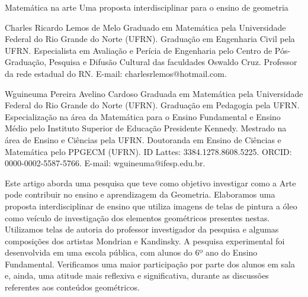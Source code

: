 \begin{refsection}
    \renewcommand{\thefigure}{\arabic{figure}}
    
    \chapterTwoLines
    {Matemática na arte}
    {Uma proposta interdisciplinar para o ensino de geometria}
    \label{chap:matematicanaarte}
    
    \articleAuthor
    {Charles Ricardo Lemos de Melo}
    {Graduado em Matemática pela Universidade Federal do Rio Grande do Norte (UFRN). Graduação em Engenharia Civil pela UFRN. Especialista em Avaliação e Perícia de Engenharia pelo Centro de Pós-Graduação, Pesquisa e Difusão Cultural das faculdades Oswaldo Cruz. Professor da rede estadual do RN. E-mail: charlesrlemos@hotmail.com.}
    
    \articleAuthor
    {Wguineuma Pereira Avelino Cardoso}
    {Graduada em Matemática pela Universidade Federal do Rio Grande do Norte (UFRN). Graduação em Pedagogia pela UFRN. Especialização na área da Matemática para o Ensino Fundamental e Ensino Médio pelo Instituto Superior de Educação Presidente Kennedy. Mestrado na área de Ensino e Ciências pela UFRN. Doutoranda em Ensino de Ciências e Matemática pelo PPGECM (UFRN). ID Lattes: 3384.1278.8608.5225. ORCID: 0000-0002-5587-5766. E-mail: wguineuma@ifesp.edu.br.}
    
    \begin{galoResumo}
        Este artigo aborda uma pesquisa que teve como objetivo investigar como a Arte pode contribuir no ensino e aprendizagem da Geometria. Elaboramos uma proposta interdisciplinar de ensino que utiliza imagens de telas de pintura a óleo como veículo de investigação dos elementos geométricos presentes nestas. Utilizamos telas de autoria do professor investigador da pesquisa e algumas composições dos artistas Mondrian e Kandinsky. A pesquisa experimental foi desenvolvida em uma escola pública, com alunos do 6º ano do Ensino Fundamental. Verificamos uma maior participação por parte dos alunos em sala e, ainda, uma atitude mais reflexiva e significativa, durante as discussões referentes aos conteúdos geométricos. 
    \end{galoResumo}
    

\end{refsection}
